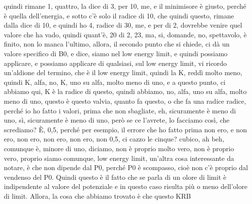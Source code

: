 \begin{soluzione}
{quindi rimane 1, quattro, la dice di 3, per 10, me, e il minimisore è giusto, perché è quella dell'energia, e sotto c'è solo il radice di 10, che quindi questo, rimane dalla dice di 10, e quindi ho 4, radice di 30, me, e per di 2, dovrebbe venire quel valore che ha vado, quindi quant'è, 20 di 2, 23, ma, si, domande, no, spettavolo, è finito, non lo manca l'ultimo, allora, il secondo punto che si chiede, ci dà un valore specifico di B0, e dice, siamo nel low energy limit, e quindi possiamo applicare, e possiamo applicare di qualsiasi, sul low energy limit, vi ricordo un'aldione del termino, che è il low energy limit, quindi la K, reddì molto meno, quindi K, alfa, no, K, uno su alfa, molto meno di uno, e a questo punto, ci abbiamo qui, K è la radice di questo, quindi abbiamo, no, alfa, uno su alfa, molto meno di uno, questo è questo valvia, quanto fa questo, o che fa una radice radice, perché io ho fatto i valori, prima che non sbagliate, eh, sicuramente è meno di uno, sì, sicuramente è meno di uno, però se ce l'avrete, lo facciamo così, che scrediamo? È, 0,5, perché per esempio, il errore che ho fatto prima non ero, e non ero, non ero, non ero, non ero, non 0,5, ci cazzo le cinque? cubico, ah beh, comunque è, minore di uno, diciamo, non è proprio molto vero, non è proprio vero, proprio siamo comunque, low energy limit, un'altra cosa interessante da notare, è che non dipende dal P0, perché P0 è scompasso, cioè non c'è proprio dal vendenso del P0. Quindi questo è il fatto che se parla di un olore di limit è indipendente al valore del potenziale e in questo caso risulta più o meno dell'olore di limit. Allora, la cosa che abbiamo trovato è che questo KRB
   
}
\end{soluzione}

